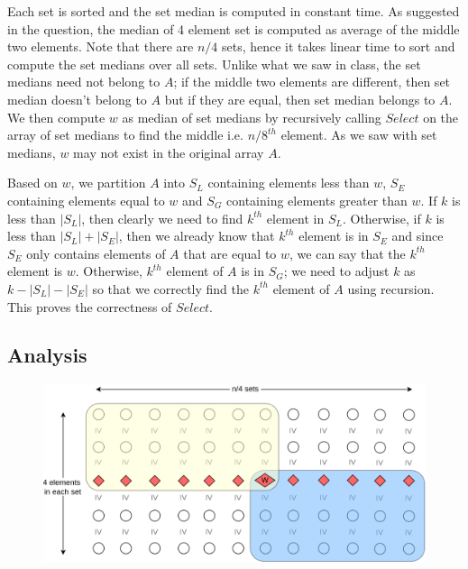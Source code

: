 \documentclass{article}
\begin{document}
    Each set is sorted and the set median is computed in constant time. As suggested in the question, the median of 4 element set is computed as average of the middle two elements. Note that there are $n/4$ sets, hence it takes linear time to sort and compute the set medians over all sets. Unlike what we saw in class, the set medians need not belong to $A$; if the middle two elements are different, then set median doesn't belong to $A$ but if they are equal, then set median belongs to $A$. We then compute $w$ as median of set medians by recursively calling $Select$ on the array of set medians to find the middle i.e. $n/8^{th}$ element. As we saw with set medians, $w$ may not exist in the original array $A$.

    Based on $w$, we partition $A$ into $S_L$ containing elements less than $w$, $S_E$ containing elements equal to $w$ and $S_G$ containing elements greater than $w$. If $k$ is less than $|S_L|$, then clearly we need to find $k^{th}$ element in $S_L$. Otherwise, if $k$ is less than $|S_L| + |S_E|$, then we already know that $k^{th}$ element is in $S_E$ and since $S_E$ only contains elements of $A$ that are equal to $w$, we can say that the  $k^{th}$ element is $w$. Otherwise,  $k^{th}$ element of $A$ is in $S_G$; we need to adjust $k$ as $k - |S_L|  - |S_E|$ so that we correctly find the $k^{th}$ element of $A$ using recursion. This proves the correctness of $Select$.

    \subsection*{Analysis}
    \begin{figure}[H]
        \includegraphics[width=1\textwidth]{selectkth.png}
    \end{figure}
\end{document}
